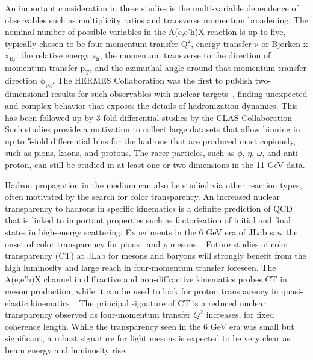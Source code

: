 An important consideration in these studies is the multi-variable dependence of observables such as multiplicity ratios and transverse momentum broadening. The nominal number of possible variables in the A(e,e'h)X reaction is up to five, typically chosen to be four-momentum transfer $\mathrm{Q^2}$, energy transfer $\mathrm{\nu}$ or Bjorken-x  $\mathrm{x_{Bj}}$, the relative energy $\mathrm{z_h}$, the momentum transverse to the direction of momentum transfer $\mathrm{p_T}$, and the azimuthal angle around that momentum transfer direction $\mathrm{\phi_{pq}}$. The HERMES Collaboration was the first to publish two-dimensional results for such observables with nuclear targets~\cite{Airapetian_2011}, finding unexpected and complex behavior that exposes the details of hadronization dynamics. This has been followed up by 3-fold differential studies by the CLAS Collaboration \cite{moran2021measurement}. Such studies provide a motivation to collect large datasets that allow binning in up to 5-fold differential bins for the hadrons that are produced most copiously, such as pions, kaons, and protons. The rarer particles, such as $\phi$, $\eta$, $\omega$, and anti-proton, can still be studied in at least one or two dimensions in the 11 GeV data.

Hadron propagation in the medium can also be studied via other reaction types, often motivated by the search for color transparency. An increased nuclear transparency to hadrons in specific kinematics is a definite prediction of QCD that is linked to important properties such as factorization of initial and final states in high-energy scattering. Experiments in the 6 GeV era of JLab saw the onset of color transparency for pions~\cite{PhysRevLett.99.242502, PhysRevC.81.055209} and $\rho$ mesons~\cite{El_Fassi_2012}. Future studies of color transparency (CT) at JLab for mesons and baryons  will strongly benefit from the high luminosity and large reach in four-momentum transfer foreseen. The A(e,e'h)X channel in diffractive and non-diffractive kinematics probes CT in meson production, while it can be used to look for proton transparency in quasi-elastic kinematics~\cite{PhysRevLett.126.082301, Bhetuwal:2022wbe}. The principal signature of CT is a reduced nuclear transparency observed as four-momentum transfer $Q^2$ increases, for fixed coherence length. While the transparency seen in the 6 GeV era was small but significant, a robust signature for light mesons is expected to be very clear as beam energy and luminosity rise.

